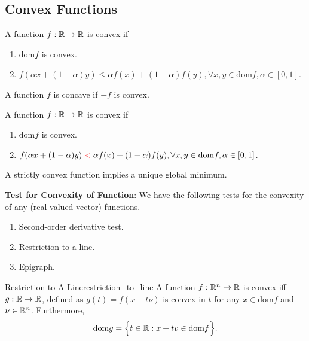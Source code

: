 \subsection{Convex Functions}
\begin{definition}
	A function $f:\mathbb{R}\to\mathbb{R}$ is convex if
	\begin{enumerate}[label=(\roman*)]
		\item $\mathrm{dom} f$ is convex.
		\item $f(\alpha x + (1-\alpha)y) \le \alpha f(x) + (1-\alpha)f(y), \forall x, y\in\mathrm{dom} f, \alpha\in [0,1]$.
	\end{enumerate} 

	\noindent A function $f$ is concave if $-f$ is convex.
\end{definition}


\begin{definition}
	A function $f:\mathbb{R}\to\mathbb{R}$ is convex if
	\begin{enumerate}[label=(\roman*)]
		\item $\mathrm{dom} f$ is convex.
		\item $f(\alpha x + (1-\alpha)y) \color{red}<\color{black} \alpha f(x) + (1-\alpha)f(y), \forall x, y\in\mathrm{dom} f, \alpha\in [0,1]$.
	\end{enumerate} 

	\noindent A strictly convex function implies a unique global minimum.
\end{definition}

\noindent\newline\textbf{Test for Convexity of Function}: We have the following tests for the convexity of any (real-valued vector) functions.
\begin{enumerate}			
	\item Second-order derivative test.
	\item Restriction to a line.
	\item Epigraph.
\end{enumerate} 

\begin{proposition}{Restriction to A Line}{restriction_to_line}
	A function $f:\mathbb{R}^n\to\mathbb{R}$ is convex iff $g:\mathbb{R}\to\mathbb{R}$, defined as $g(t)=f(x+t\nu)$ is convex in $t$ for any $x\in\mathrm{dom}f$ and $\nu\in \mathbb{R}^n$.	Furthermore,
	\begin{equation}
		\mathrm{dom} g = \Big\{ 
			t\in\mathbb{R}: x+tv \in \mathrm{dom}f
		 \Big\}.
	\end{equation} 
\end{proposition} 


